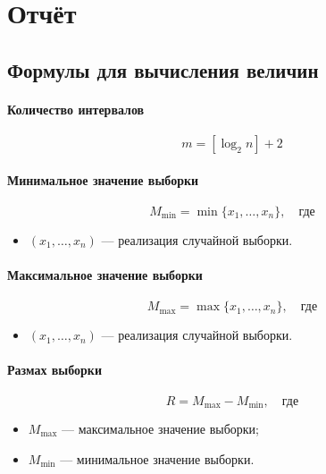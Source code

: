 
\section{Отчёт}

\subsection{Формулы для вычисления величин}

\paragraph{Количество интервалов}
\begin{equation}
m = [\log_2 n] + 2
\end{equation}


\paragraph{Минимальное значение выборки}

\begin{equation}
    M_{\min} = \min \{ x_1, \dots, x_n\}, \quad \text{где}
\end{equation}
\begin{itemize}
    \item $(x_1, \dots, x_n)$ --- реализация случайной выборки.
\end{itemize}


\paragraph{Максимальное значение выборки}

\begin{equation}
    M_{\max} = \max \{ x_1, \dots, x_n\}, \quad \text{где}
\end{equation}
\begin{itemize}
    \item $(x_1, \dots, x_n)$ --- реализация случайной выборки.
\end{itemize}


\paragraph{Размах выборки}

\begin{equation}
    R = M_{\max} - M_{\min}, \quad \text{где}
\end{equation}
\begin{itemize}
    \item $M_{\max}$ --- максимальное значение выборки;
    \item $M_{\min}$ --- минимальное значение выборки.
\end{itemize}


